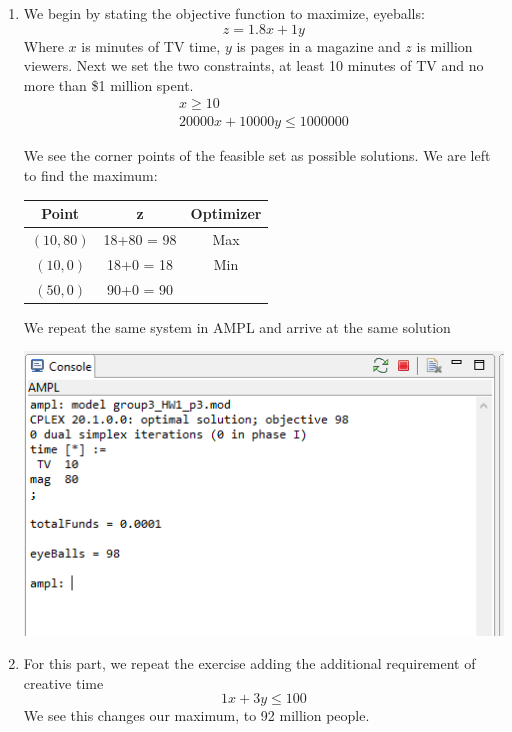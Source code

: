 \documentclass[11pt]{article}
\begin{document}
\begin{enumerate}
\begin{enumerate}
\item We begin by stating the objective function to maximize, eyeballs:
\[
z = 1.8 x + 1y
\]
Where $x$ is minutes of TV time, $y$ is pages in a magazine and $z$ is million viewers.  Next we set the two constraints, at least 10 minutes of TV and no more than \$1 million spent.
\[
\begin{array}{l}
x\geq 10\\
20 000 x + 10 000 y \leq 1 000 000
\end{array}
\]


We see the corner points of the feasible set as possible solutions.  We are left to find the maximum:

\begin{tabular}{c|c|c}
Point& z & Optimizer\\\hline
$(10,80)$& 18+80 = 98&Max\\
$(10,0)$& 18+0 = 18&Min\\
$(50,0)$& 90+0 = 90&
\end{tabular}
We repeat the same system in AMPL and arrive at the same solution

\includegraphics{outputp3a.png}
\item For this part, we repeat the exercise adding the additional requirement of creative time
\[
1x+3y\leq 100
\]
We see this changes our maximum, to 92 million people.


\end{enumerate}
\end{enumerate}
\end{document}
